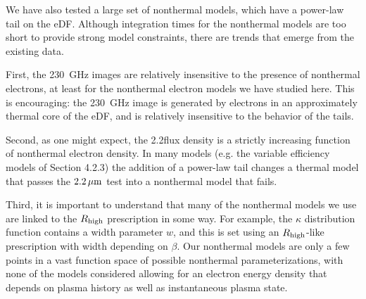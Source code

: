 We have also tested a large set of nonthermal models, which have a power-law tail on the eDF.  Although integration times for the nonthermal models are too short to provide strong model constraints, there are trends that emerge from the existing data.

First, the 230~GHz images are relatively insensitive to the presence of nonthermal electrons, at least for the nonthermal electron models we have studied here.  This is encouraging: the 230~GHz image is generated by electrons in an approximately thermal core of the eDF, and is relatively insensitive to the behavior of the tails.

Second, as one might expect, the 2.2\um flux density is a strictly increasing function of nonthermal electron density.  In many models (e.g. the variable efficiency models of Section 4.2.3) the addition of a power-law tail changes a thermal model that passes the $2.2\,\mu\mathrm{m}$ test into a nonthermal model that fails.

Third, it is important to understand that many of the nonthermal models we use are linked to the $R_\mathrm{high}$ prescription in some way.  For example, the $\kappa$ distribution function contains a width parameter $w$, and this is set using an $R_\mathrm{high}$-like prescription with width depending on $\beta$.  Our nonthermal models are only a few points in a vast function space of possible nonthermal parameterizations, with none of the models considered allowing for an electron energy density that depends on plasma history as well as instantaneous plasma state.





